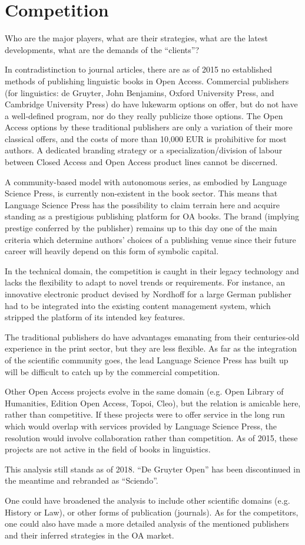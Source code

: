 \documentclass[output=guidelines,nonflat,smallfont,
draftmode
]{langsci/langscibook}
\newcommand{\background}[1]{ 
  \vspace{5mm}
  \renewcommand{\tblslinecolour}{lsDarkBlue}
  \tblssy[red]{explore2}{Background}{\vspace*{-5mm}#1}
}
\newcommand{\langscisolution}[1]{
  \renewcommand{\tblslinecolour}{lsLightBlue}
  \tblssy{langsci}{LangSci solution}{\vspace*{-5mm}#1}
}
\newcommand{\evaluation}[1]{
  \renewcommand{\tblslinecolour}{lsLightOrange}
  \tblssy{receipt}{Evaluation}{\vspace*{-5mm}#1}
}
\newcommand{\othersolutions}[1]{
  \renewcommand{\tblslinecolour}{lsDarkGreenOne}
  \tblssy{more}{Other solutions}{\vspace*{-5mm}#1}
}
\renewcommand{\tblssy}[4][black!12]{%
  \renewcommand{\langscisymbol}{#2}\renewcommand{\tblsboxcolor}{#1}
  \begin{mdframed}[style=yellowexercise,frametitle={#3}]
    #4
  \end{mdframed}
}
\begin{document}
 
\section{Competition }
\background{Who are the major players, what are their strategies, what are the latest developments, what are the demands of the ``clients''?}
\langscisolution{
In contradistinction to journal articles, there are as of 2015 no established methods of publishing linguistic books in Open Access. Commercial publishers (for linguistics: de Gruyter, John Benjamins, Oxford University Press, and Cambridge University Press) do have lukewarm options on offer, but do not have a well-defined program, nor do they really publicize those options. The Open Access options by these traditional publishers are only a variation of their more classical offers, and the costs of more than 10,000 EUR is prohibitive for most authors. A dedicated branding strategy or a specialization/division of labour between Closed Access and Open Access product lines cannot be discerned.

A community-based model with autonomous series, as embodied by Language Science Press, is currently non-existent in the book sector. This means that Language Science Press has the possibility to claim terrain here and acquire standing as a prestigious publishing platform for OA books.  The brand (implying prestige conferred by the publisher) remains up to this day one of the main criteria which determine authors' choices of a publishing venue since their future career will heavily depend on this form of symbolic capital. 

In the technical domain, the competition is caught in their legacy technology and lacks the flexibility to adapt to novel trends or requirements. For instance, an innovative electronic product devised by Nordhoff for a large German publisher had to be integrated into the existing content management system, which stripped the platform of its intended key features. 

The traditional publishers do have advantages emanating from their centuries-old experience in the print sector, but they are less flexible. As far as the integration of the scientific community goes, the lead Language Science Press has built up will be difficult to catch up by the commercial competition.  

Other Open Access projects evolve in the same domain (e.g. Open Library of Humanities, Edition Open Access, Topoi, Cleo), but the relation is amicable here, rather than competitive.
If these projects were to offer service in the long run which would overlap with services provided by Language Science Press, the resolution would involve collaboration rather than competition. As of 2015, these projects are not active in the field of books in linguistics. 
}
\evaluation{This analysis still stands as of 2018. ``De Gruyter Open'' has been discontinued in the meantime and rebranded as ``Sciendo''. }
\othersolutions{One could have broadened the analysis to include other scientific domains (e.g. History or Law), or other forms of publication (journals). As for the competitors, one could also have made a more detailed analysis of the mentioned publishers and their inferred strategies in the OA market.}
 
\end{document}
